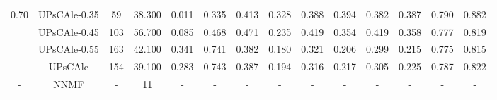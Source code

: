 \begin{table*}
\begin{scriptsize}
\begin{tabular}{|c||c|c|c|c||c|c|c|c|c|c|c|c|c|}
\multirow{3}{*}{0.70} 
 & UPsCAle-0.35 & 59& 38.300 & 0.011 & 0.335 & 0.413 & 0.328 & 0.388 & 0.394 & 0.382 & 0.387 & 0.790 & 0.882
\\ 
 & UPsCAle-0.45 & 103& 56.700 & 0.085 & 0.468 & 0.471 & 0.235 & 0.419 & 0.354 & 0.419 & 0.358 & 0.777 & 0.819
\\ 
 & UPsCAle-0.55 & 163& 42.100 & 0.341 & 0.741 & 0.382 & 0.180 & 0.321 & 0.206 & 0.299 & 0.215 & 0.775 & 0.815
\\
& UPsCAle       & 154 & 39.100 & 0.283 & 0.743 & 0.387 & 0.194 & 0.316 & 0.217 & 0.305 & 0.225 & 0.787 & 0.822
\\ \hline
- & NNMF & - & 11 & - & - & - & - & - & - & - & - & - & - 
\\ \hline

\end{tabular}


\end{scriptsize}
\end{table*}


